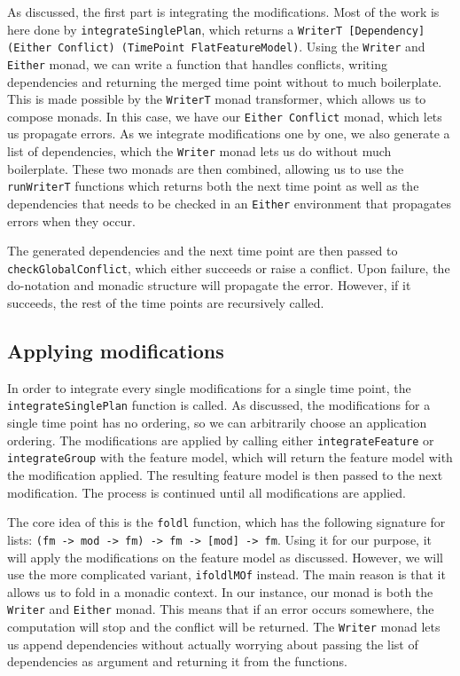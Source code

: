 \documentclass[a4paper,english]{ifimaster}
\begin{document}
As discussed, the first part is integrating the modifications. Most of the work is here done by \texttt{integrateSinglePlan}, which returns a \texttt{WriterT [Dependency] (Either Conflict) (TimePoint FlatFeatureModel)}. Using the \texttt{Writer} and \texttt{Either} monad, we can write a function that handles conflicts, writing dependencies and returning the merged time point without to much boilerplate. This is made possible by the \texttt{WriterT} monad transformer, which allows us to compose monads. In this case, we have our \texttt{Either Conflict} monad, which lets us propagate errors. As we integrate modifications one by one, we also generate a list of dependencies, which the \texttt{Writer} monad lets us do without much boilerplate. These two monads are then combined, allowing us to use the \texttt{runWriterT} functions which returns both the next time point as well as the dependencies that needs to be checked in an \texttt{Either} environment that propagates errors when they occur.

The generated dependencies and the next time point are then passed to \texttt{checkGlobalConflict}, which either succeeds or raise a conflict. Upon failure, the do-notation and monadic structure will propagate the error. However, if it succeeds, the rest of the time points are recursively called.

\subsection{Applying modifications}%
\label{sub:applying_modifications}

In order to integrate every single modifications for a single time point, the \texttt{integrateSinglePlan} function is called. As discussed, the modifications for a single time point has no ordering, so we can arbitrarily choose an application ordering. The modifications are applied by calling either \texttt{integrateFeature} or \texttt{integrateGroup} with the feature model, which will return the feature model with the modification applied. The resulting feature model is then passed to the next modification. The process is continued until all modifications are applied.

The core idea of this is the \texttt{foldl} function, which has the following signature for lists: \texttt{(fm -> mod -> fm) -> fm -> [mod] -> fm}. Using it for our purpose, it will apply the modifications on the feature model as discussed. However, we will use the more complicated variant, \texttt{ifoldlMOf} instead. The main reason is that it allows us to fold in a monadic context. In our instance, our monad is both the \texttt{Writer} and \texttt{Either} monad. This means that if an error occurs somewhere, the computation will stop and the conflict will be returned. The \texttt{Writer} monad lets us append dependencies without actually worrying about passing the list of dependencies as argument and returning it from the functions.
\end{document}

